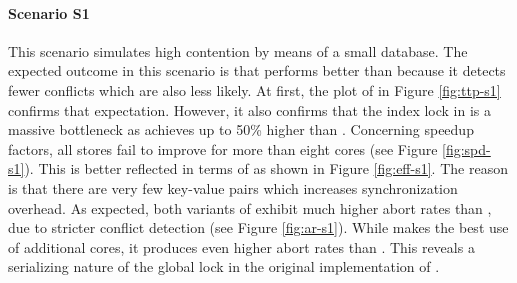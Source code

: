 \clearpage

\paragraph{Scenario S1}


This scenario simulates high contention by means of a small database. The
expected outcome in this scenario is that \echo performs better than \midas
because it detects fewer conflicts which are also less likely. At first, the
plot of \ttp in Figure \ref{fig:ttp-s1} confirms that expectation. However, it
also confirms that the index lock in \midas is a massive bottleneck as \midasopt
achieves up to 50\% higher \tput than \echo. Concerning speedup factors, all
stores fail to improve for more than eight cores (see Figure \ref{fig:spd-s1}).
This is better reflected in terms of \eff as shown in Figure \ref{fig:eff-s1}.
The reason is that there are very few key-value pairs which increases
synchronization overhead. As expected, both variants of \midas exhibit much
higher abort rates than \echo, due to stricter conflict detection (see Figure
\ref{fig:ar-s1}). While \midasopt makes the best use of additional cores, it
produces even higher abort rates than \midas. This reveals a serializing nature
of the global lock in the original implementation of \midas.

